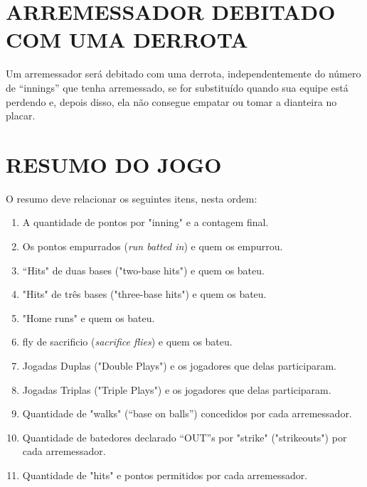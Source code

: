 \section{ARREMESSADOR DEBITADO COM UMA DERROTA }
\begin{multicols}{2}
	Um arremessador será debitado com uma derrota, independentemente do número de
	“innings” que tenha arremessado, se for substituído quando sua equipe está perdendo
	e, depois disso, ela não consegue empatar ou tomar a dianteira no placar.
\end{multicols}
\section{RESUMO DO JOGO }
\begin{multicols}{2}
	O resumo deve relacionar os seguintes itens, nesta ordem:

	\begin{enumerate}[label=\alph*)]
		\item A quantidade de pontos por "inning" e a contagem final.

		\item  Os pontos empurrados (\textit{run batted in}) e quem os empurrou.

		\item  “Hits" de duas bases ("two-base hits") e quem os bateu.

		\item  "Hits" de três bases ("three-base hits") e quem os bateu.

		\item  "Home runs" e quem os bateu.

		\item  \Gls{fly de sacrificio} (\textit{sacrifice flies}) e quem os bateu.

		\item  Jogadas Duplas ("Double Plays") e os jogadores que delas participaram.

		\item  Jogadas Triplas ("Triple Plays") e os jogadores que delas participaram.

		\item  Quantidade de "walks" (“base on balls”) concedidos por cada arremessador.
		\item Quantidade de batedores declarado “OUT”s por "strike" ("strikeouts") por cada
		arremessador.

		\item  Quantidade de "hits" e pontos permitidos por cada arremessador.


\end{enumerate}
\end{multicols}
